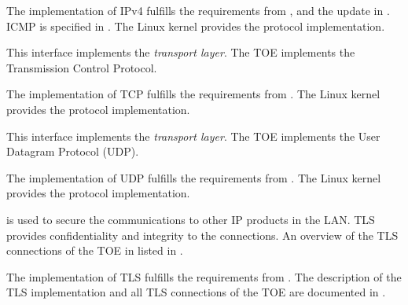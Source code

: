 

The implementation of IPv4 fulfills the requirements from ,
 and the update in . ICMP is specified in
. The Linux kernel provides the protocol implementation.



This interface implements the \emph{transport layer}. The TOE implements the
Transmission Control Protocol.



The implementation of TCP fulfills the requirements from . The Linux
kernel provides the protocol implementation.



This interface implements the \emph{transport layer}. The TOE implements the
User Datagram Protocol (UDP).



The implementation of UDP fulfills the requirements from . The Linux
kernel provides the protocol implementation.



\lslantls{} is used to secure the communications to other IP products in the
LAN. TLS provides confidentiality and integrity to the connections. An overview
of the TLS connections of the TOE in listed in .



The implementation of TLS fulfills the requirements from . The
description of the TLS implementation and all TLS connections of the TOE are
documented in .



